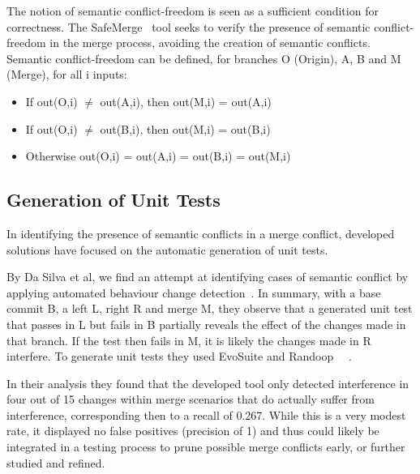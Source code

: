 The notion of semantic conflict-freedom is seen as a sufficient condition for correctness. The SafeMerge~\citep{kn:safemerge} tool seeks to verify the presence of semantic conflict-freedom in the merge process, avoiding the creation of semantic conflicts. Semantic conflict-freedom can be defined, for branches O (Origin), A, B and M (Merge), for all i inputs:
\begin{itemize}
  \item If out(O,i) $\neq$ out(A,i), then out(M,i) = out(A,i)
  \item If out(O,i) $\neq$ out(B,i), then out(M,i) = out(B,i)
  \item Otherwise out(O,i) = out(A,i) = out(B,i) = out(M,i)
\end{itemize}

\subsection{Generation of Unit Tests}

In identifying the presence of semantic conflicts in a merge conflict, developed solutions have focused on the automatic generation of unit tests.

By Da Silva et al, we find an attempt at identifying cases of semantic conflict by applying automated behaviour change detection~\citep{kn:leuson}. In summary, with a base commit B, a left L, right R and merge M, they observe that a generated unit test that passes in L but fails in B partially reveals the effect of the changes made in that branch. If the test then fails in M, it is likely the changes made in R interfere. To generate unit tests they used EvoSuite and Randoop~\citep{kn:randoop}
~\citep{kn:evosuite}.

In their analysis they found that the developed tool only detected interference in four out of 15 changes within merge scenarios that do actually suffer from interference, corresponding then to a recall of 0.267. While this is a very modest rate, it displayed no false positives (precision of 1) and thus could likely be integrated in a testing process to prune possible merge conflicts early, or further studied and refined.

